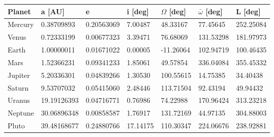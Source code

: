 \documentclass[Orbiter User Manual.tex]{subfiles}
\begin{document}
	\begin{longtable}{ |p{}|p{}|p{}|p{}|p{}|p{}|p{}| }
	\hline\rule{0pt}{2ex}
	\textbf{Planet} & \textbf{a [AU]} & \textbf{e} & \textbf{i [deg]} & \textbf{$\Omega$ [deg]} & \textbf{$\bar{\omega}$ [deg]} & \textbf{L [deg]}\\
	\hline\rule{0pt}{2ex}
	Mercury & 0.38709893 & 0.20563069 & 7.00487 & 48.33167 & 77.45645 & 252.25084\\
	\hline\rule{0pt}{2ex}
	Venus & 0.72333199 & 0.00677323 & 3.39471 & 76.68069 & 131.53298 & 181.97973\\
	\hline\rule{0pt}{2ex}
	Earth & 1.00000011 & 0.01671022 & 0.00005 & -11.26064 & 102.94719 & 100.46435\\
	\hline\rule{0pt}{2ex}
	Mars & 1.52366231 & 0.09341233 & 1.85061 & 49.57854 & 336.04084 & 355.45332\\
	\hline\rule{0pt}{2ex}
	Jupiter & 5.20336301 & 0.04839266 & 1.30530 & 100.55615 & 14.75385 & 34.40438\\
	\hline\rule{0pt}{2ex}
	Saturn & 9.53707032 & 0.05415060 & 2.48446 & 113.71504 & 92.43194 & 49.94432\\
	\hline\rule{0pt}{2ex}
	Uranus & 19.19126393 & 0.04716771 & 0.76986 & 74.22988 & 170.96424 & 313.23218\\
	\hline\rule{0pt}{2ex}
	Neptune & 30.06896348 & 0.00858587 & 1.76917 & 131.72169 & 44.97135 & 304.88003\\
	\hline\rule{0pt}{2ex}
	Pluto & 39.48168677 & 0.24880766 & 17.14175 & 110.30347 & 224.06676 & 238.92881\\
	\hline
	\end{longtable}
\end{document}

